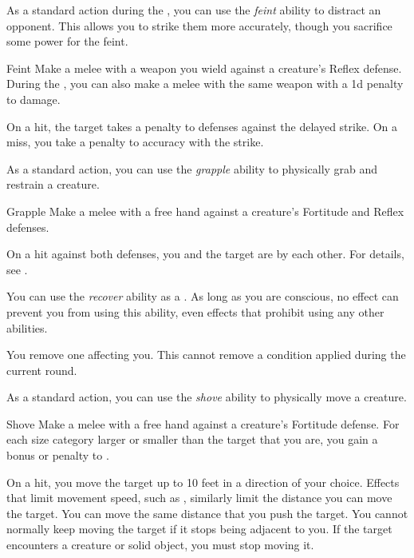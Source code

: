          As a standard action during the , you can use the \textit{feint} ability to distract an opponent.
        This allows you to strike them more accurately, though you sacrifice some power for the feint.

        \begin{freeability}{Feint}\label{Feint}
            Make a melee  with a weapon you wield against a creature's Reflex defense.
            During the , you can also make a melee  with the same weapon with a \minus1d penalty to damage.

            On a hit, the target takes a  penalty to defenses against the delayed strike.
            On a miss, you take a  penalty to accuracy with the strike.
        \end{freeability}

         As a standard action, you can use the \textit{grapple} ability to physically grab and restrain a creature.

        \begin{freeability}{Grapple}\label{Grapple}
            Make a melee  with a free hand against a creature's Fortitude and Reflex defenses.

            On a hit against both defenses, you and the target are \grappled by each other.
            For details, see .
        \end{freeability}

         You can use the \textit{recover} ability as a .
        As long as you are conscious, no effect can prevent you from using this ability, even effects that prohibit using any other abilities.
        \begin{apability}{}
            You remove one  affecting you.
            This cannot remove a condition applied during the current round.
        \end{apability}

         As a standard action, you can use the \textit{shove} ability to physically move a creature.

        \begin{freeability}{Shove}\label{Shove}
            Make a melee  with a free hand against a creature's Fortitude defense.
            For each size category larger or smaller than the target that you are, you gain a  bonus or penalty to .

            On a hit, you move the target up to 10 feet in a direction of your choice.
            Effects that limit movement speed, such as , similarly limit the distance you can move the target.
            You can move the same distance that you push the target.
            You cannot normally keep moving the target if it stops being adjacent to you.
            If the target encounters a creature or solid object, you must stop moving it.
        \end{freeability}

